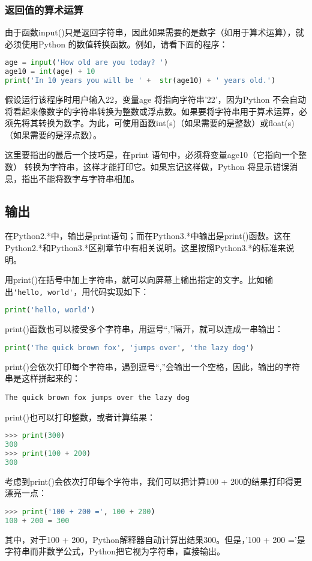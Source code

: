 \subsubsection{返回值的算术运算}
由于函数input()只是返回字符串，因此如果需要的是数字（如用于算术运算），就必须使用Python 的数值转换函数。例如，请看下面的程序：
\begin{lstlisting}[language=Python]
age = input('How old are you today? ')
age10 = int(age) + 10
print('In 10 years you will be ' +  str(age10) + ' years old.')
\end{lstlisting}
假设运行该程序时用户输入22，变量age 将指向字符串'22'，因为Python 不会自动将看起来像数字的字符串转换为整数或浮点数。如果要将字符串用于算术运算，必须先将其转换为数字。为此，可使用函数int(s)（如果需要的是整数）或float(s)（如果需要的是浮点数）。

这里要指出的最后一个技巧是，在print 语句中，必须将变量age10（它指向一个整数） 转换为字符串，这样才能打印它。如果忘记这样做，Python 将显示错误消息，指出不能将数字与字符串相加。


\subsection{输出}
在Python2.*中，输出是print语句；而在Python3.*中输出是print()函数。这在Python2.*和Python3.*区别章节中有相关说明。这里按照Python3.*的标准来说明。

用print()在括号中加上字符串，就可以向屏幕上输出指定的文字。比如输出\verb|'hello, world'|，用代码实现如下：
\begin{lstlisting}[language=Python]
print('hello, world')
\end{lstlisting}
print()函数也可以接受多个字符串，用逗号“,”隔开，就可以连成一串输出：
\begin{lstlisting}[language=Python]
 print('The quick brown fox', 'jumps over', 'the lazy dog')
\end{lstlisting}
print()会依次打印每个字符串，遇到逗号“,”会输出一个空格，因此，输出的字符串是这样拼起来的：

\verb|The quick brown fox jumps over the lazy dog|

print()也可以打印整数，或者计算结果：
\begin{lstlisting}[language=Python]
>>> print(300)
300
>>> print(100 + 200)
300
\end{lstlisting}

考虑到print()会依次打印每个字符串，我们可以把计算100 + 200的结果打印得更漂亮一点：
\begin{lstlisting}[language=Python]
>>> print('100 + 200 =', 100 + 200)
100 + 200 = 300
\end{lstlisting}
其中，对于100 + 200，Python解释器自动计算出结果300。但是，'100 + 200 ='是字符串而非数学公式，Python把它视为字符串，直接输出。



